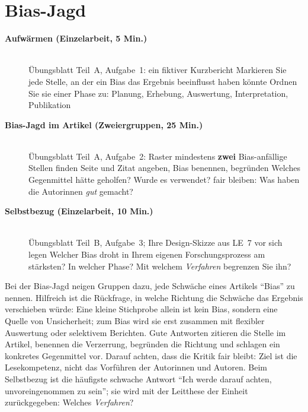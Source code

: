 \section{Bias-Jagd}
\begin{description}
\item[{\rot\bf Aufwärmen (Einzelarbeit, 5 Min.)}]~\\[-\lblskip]
\bi
  \ite Übungsblatt Teil~A, Aufgabe~1: ein fiktiver Kurzbericht
  \ite Markieren Sie jede Stelle, an der ein Bias das Ergebnis
    beeinflusst haben könnte
  \ite Ordnen Sie sie einer Phase zu: Planung, Erhebung, Auswertung,
    Interpretation, Publikation
\ei
\os{\newpage}

\item[{\rot\bf Bias-Jagd im Artikel (Zweiergruppen, 25 Min.)}]~\\[-\lblskip]
\bi
  \ite Übungsblatt Teil~A, Aufgabe~2: Raster
  \ite mindestens \textbf{zwei} Bias-anfällige Stellen finden
  \ite Seite und Zitat angeben, Bias benennen, begründen
  \ite Welches Gegenmittel hätte geholfen? Wurde es verwendet?
  \ite fair bleiben: Was haben die Autorinnen \emph{gut} gemacht?
\ei
\os{\newpage}

\item[{\rot\bf Selbstbezug (Einzelarbeit, 10 Min.)}]~\\[-\lblskip]
\bi
  \ite Übungsblatt Teil~B, Aufgabe~3; Ihre Design-Skizze aus LE~7 vor
    sich legen
  \ite Welcher Bias droht in Ihrem eigenen Forschungsprozess am
    stärksten?
  \ite In welcher Phase?
  \ite Mit welchem \emph{Verfahren} begrenzen Sie ihn?
\ei
\os{\newpage}
\end{description}

\begin{lehrhinweis}
Bei der Bias-Jagd neigen Gruppen dazu, jede Schwäche eines Artikels
\enquote{Bias} zu nennen. Hilfreich ist die Rückfrage, in welche Richtung
die Schwäche das Ergebnis verschieben würde: Eine kleine Stichprobe allein
ist kein Bias, sondern eine Quelle von Unsicherheit; zum Bias wird sie
erst zusammen mit flexibler Auswertung oder selektivem Berichten. Gute
Antworten zitieren die Stelle im Artikel, benennen die Verzerrung,
begründen die Richtung und schlagen ein konkretes Gegenmittel vor. Darauf
achten, dass die Kritik fair bleibt: Ziel ist die Lesekompetenz, nicht
das Vorführen der Autorinnen und Autoren. Beim Selbstbezug ist die
häufigste schwache Antwort \enquote{Ich werde darauf achten,
unvoreingenommen zu sein}; sie wird mit der Leitthese der Einheit
zurückgegeben: Welches \emph{Verfahren}?
\end{lehrhinweis}

